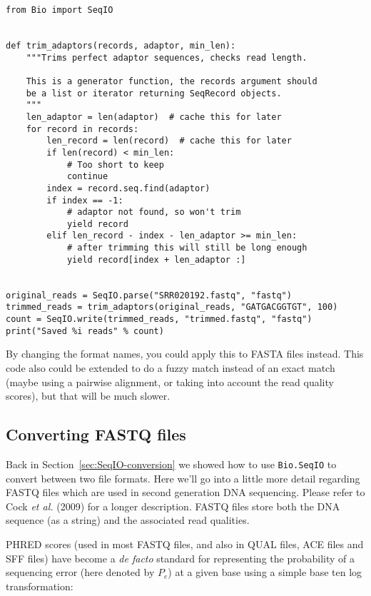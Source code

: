 \begin{verbatim}
from Bio import SeqIO


def trim_adaptors(records, adaptor, min_len):
    """Trims perfect adaptor sequences, checks read length.

    This is a generator function, the records argument should
    be a list or iterator returning SeqRecord objects.
    """
    len_adaptor = len(adaptor)  # cache this for later
    for record in records:
        len_record = len(record)  # cache this for later
        if len(record) < min_len:
            # Too short to keep
            continue
        index = record.seq.find(adaptor)
        if index == -1:
            # adaptor not found, so won't trim
            yield record
        elif len_record - index - len_adaptor >= min_len:
            # after trimming this will still be long enough
            yield record[index + len_adaptor :]


original_reads = SeqIO.parse("SRR020192.fastq", "fastq")
trimmed_reads = trim_adaptors(original_reads, "GATGACGGTGT", 100)
count = SeqIO.write(trimmed_reads, "trimmed.fastq", "fastq")
print("Saved %i reads" % count)
\end{verbatim}

By changing the format names, you could apply this to FASTA files instead.
This code also could be extended to do a fuzzy match instead of an exact
match (maybe using a pairwise alignment, or taking into account the read
quality scores), but that will be much slower.

\subsection{Converting FASTQ files}
\label{sec:SeqIO-fastq-conversion}

Back in Section~\ref{sec:SeqIO-conversion} we showed how to use
\verb|Bio.SeqIO| to convert between two file formats. Here we'll go into a
little more detail regarding FASTQ files which are used in second generation
DNA sequencing. Please refer to Cock \textit{et al.} (2009) \cite{cock2010}
for a longer description. FASTQ files store both the DNA sequence (as a string)
and the associated read qualities.

PHRED scores (used in most FASTQ files, and also in QUAL files, ACE files
and SFF files) have become a \textit{de facto} standard for representing
the probability of a sequencing error (here denoted by $P_e$) at a given
base using a simple base ten log transformation:

